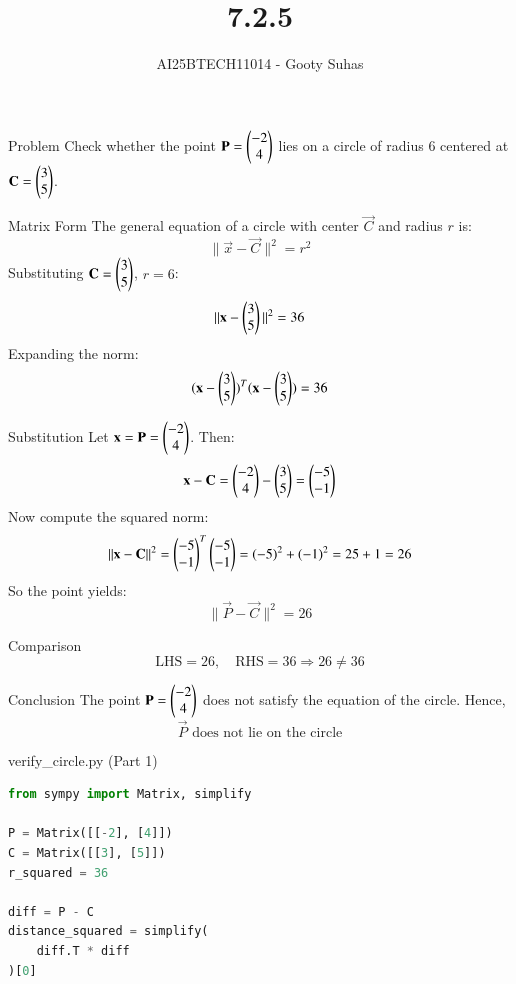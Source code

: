 \documentclass{beamer}
\title{7.2.5}
\author{AI25BTECH11014 - Gooty Suhas}
\begin{document}
\frame{\titlepage}

\begin{frame}{Problem}
Check whether the point \( \mathbf{P} = \begin{pmatrix}-2 \\ 4\end{pmatrix} \) lies on a circle of radius 6 centered at  
\( \mathbf{C} = \begin{pmatrix}3 \\ 5\end{pmatrix} \).
\end{frame}

\begin{frame}{Matrix Form}
The general equation of a circle with center \( \vec{C} \) and radius \( r \) is:
\[
\|\vec{x} - \vec{C}\|^2 = r^2
\]
Substituting \( \mathbf{C} = \begin{pmatrix}3 \\ 5\end{pmatrix} \), \( r = 6 \):
\[
\|\mathbf{x} - \begin{pmatrix}3 \\ 5\end{pmatrix}\|^2 = 36
\]
Expanding the norm:
\[
(\mathbf{x} - \begin{pmatrix}3 \\ 5\end{pmatrix})^T (\mathbf{x} - \begin{pmatrix}3 \\ 5\end{pmatrix}) = 36
\]
\end{frame}






\begin{frame}{Substitution}
Let \( \mathbf{x} = \mathbf{P} = \begin{pmatrix}-2 \\ 4\end{pmatrix} \). Then:
\[
\mathbf{x} - \mathbf{C} = \begin{pmatrix}-2 \\ 4\end{pmatrix} - \begin{pmatrix}3 \\ 5\end{pmatrix} = \begin{pmatrix}-5 \\ -1\end{pmatrix}
\]
Now compute the squared norm:
\[
\|\mathbf{x} - \mathbf{C}\|^2 = \begin{pmatrix}-5 \\ -1\end{pmatrix}^T \begin{pmatrix}-5 \\ -1\end{pmatrix}
= (-5)^2 + (-1)^2 = 25 + 1 = 26
\]
So the point yields:
\[
\|\vec{P} - \vec{C}\|^2 = 26
\]
\end{frame}






\begin{frame}{Comparison}
\[
\text{LHS} = 26, \quad \text{RHS} = 36
\Rightarrow 26 \ne 36
\]
\end{frame}

\begin{frame}{Conclusion}
The point \( \mathbf{P} = \begin{pmatrix}-2 \\ 4\end{pmatrix} \) does not satisfy the equation of the circle.  
Hence,  
\[
\boxed{\vec{P} \text{ does not lie on the circle}}
\]
\end{frame}

\begin{frame}[fragile]{verify\_circle.py (Part 1)}
\begin{lstlisting}[language=Python]
from sympy import Matrix, simplify

P = Matrix([[-2], [4]])
C = Matrix([[3], [5]])
r_squared = 36

diff = P - C
distance_squared = simplify(
    diff.T * diff
)[0]
\end{lstlisting}
\end{frame}
\end{document}
